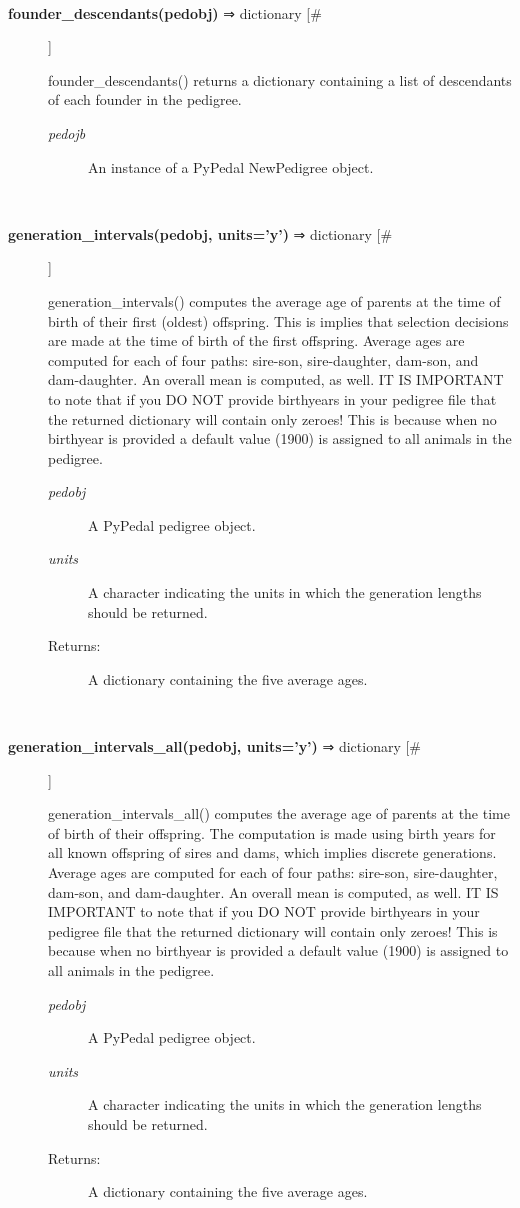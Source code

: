 \begin{description}
\begin{description}
\end{description}
\\ 

\item[\textbf{founder\_descendants(pedobj)}
 ⇒ dictionary [\#]]

 founder\_descendants() returns a dictionary containing a list of descendants of each founder in the pedigree.
\begin{description}
\item[\emph{pedojb}
] An instance of a PyPedal NewPedigree object.

\end{description}
\\ 

\item[\textbf{generation\_intervals(pedobj, units='y')}
 ⇒ dictionary [\#]]

 generation\_intervals() computes the average age of parents at the time of birth of their first (oldest) offspring. This is implies that selection decisions are made at the time of birth of the first offspring. Average ages are computed for each of four paths: sire-son, sire-daughter, dam-son, and dam-daughter. An overall mean is computed, as well. IT IS IMPORTANT to note that if you DO NOT provide birthyears in your pedigree file that the returned dictionary will contain only zeroes! This is because when no birthyear is provided a default value (1900) is assigned to all animals in the pedigree.
\begin{description}
\item[\emph{pedobj}
] A PyPedal pedigree object.
\item[\emph{units}
] A character indicating the units in which the generation lengths should be returned.
\item[Returns:] A dictionary containing the five average ages.

\end{description}
\\ 

\item[\textbf{generation\_intervals\_all(pedobj, units='y')}
 ⇒ dictionary [\#]]

 generation\_intervals\_all() computes the average age of parents at the time of birth of their offspring. The computation is made using birth years for all known offspring of sires and dams, which implies discrete generations. Average ages are computed for each of four paths: sire-son, sire-daughter, dam-son, and dam-daughter. An overall mean is computed, as well. IT IS IMPORTANT to note that if you DO NOT provide birthyears in your pedigree file that the returned dictionary will contain only zeroes! This is because when no birthyear is provided a default value (1900) is assigned to all animals in the pedigree.
\begin{description}
\item[\emph{pedobj}
] A PyPedal pedigree object.
\item[\emph{units}
] A character indicating the units in which the generation lengths should be returned.
\item[Returns:] A dictionary containing the five average ages.


\end{description}
\end{description}
